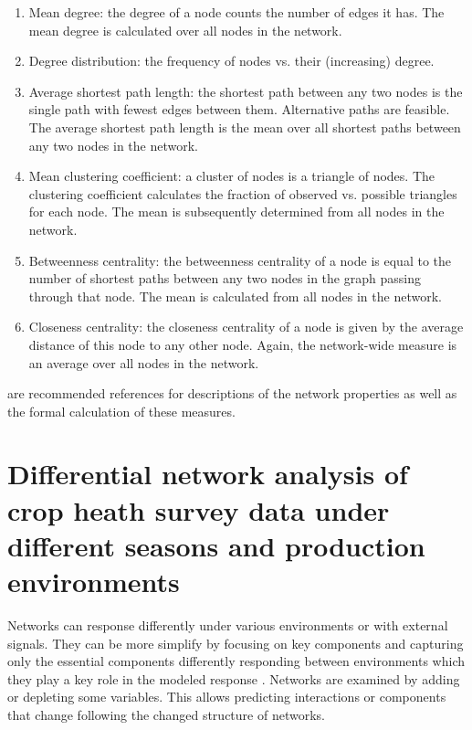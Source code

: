 \begin{enumerate}
\item Mean degree: the degree of a node counts the number of edges it has. The mean degree is calculated over all nodes in the network.
\item Degree distribution: the frequency of nodes vs. their (increasing) degree.
\item Average shortest path length: the shortest path between any two nodes is the single path with fewest edges between them. Alternative paths are feasible. The average shortest path length is the mean over all shortest paths between any two nodes in the network.
\item Mean clustering coefficient: a cluster of nodes is a triangle of nodes. The clustering coefficient calculates the fraction of observed vs. possible triangles for each node. The mean is subsequently determined from all nodes in the network.
\item Betweenness centrality: the betweenness centrality of a node is equal to the number of shortest paths between any two nodes in the graph passing through that node. The mean is calculated from all nodes in the network.
\item Closeness centrality: the closeness centrality of a node is given by the average distance of this node to any other node. Again, the network-wide measure is an average over all nodes in the network.
\end{enumerate}

 are recommended references for descriptions of the network properties as well as the formal calculation of these measures.

\section*{Differential network analysis of crop heath survey data under different seasons and production environments}



Networks can response differently under various environments or with external signals. They can be more simplify by focusing on key components and capturing only the essential components differently responding between environments which they play a key role in the modeled response . Networks are examined by adding or depleting some variables. This allows predicting interactions or components that change following the changed structure of networks. 

